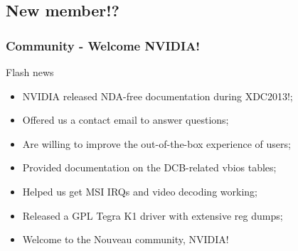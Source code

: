 \documentclass[11pt,english,compress]{beamer}
\begin{document}
\subsection{New member!?}
\begin{frame}
	\frametitle{Community - Welcome NVIDIA!}

	\begin{block}{Flash news}
		\begin{itemize}
			\item NVIDIA released NDA-free documentation during
XDC2013!;
			\item Offered us a contact email to answer questions;
			\item Are willing to improve the out-of-the-box
experience of users;
			\item Provided documentation on the DCB-related vbios
tables;
			\item Helped us get MSI IRQs and video decoding working;
			\item Released a GPL Tegra K1 driver with extensive reg
dumps;
			\item Welcome to the Nouveau community, NVIDIA!
		\end{itemize}
	\end{block}
\end{frame}

%
\end{document}
